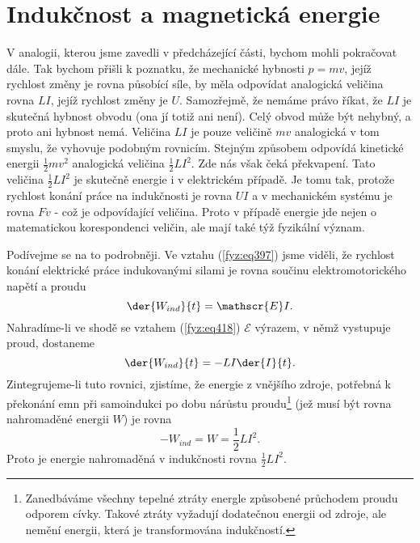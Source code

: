 \section{Indukčnost a magnetická energie}\label{fyz:IIchapXVIIsecVIII}
  V analogii, kterou jsme zavedli v předcházející části, bychom mohli pokračovat dále. Tak bychom 
  přišli k poznatku, že mechanické hybnosti \(p=mv\), jejíž rychlost změny je rovna působící síle, 
  by měla odpovídat analogická veličina rovna \(LI\), jejíž rychlost změny je \(U\). Samozřejmě, že 
  nemáme právo říkat, že \(LI\) je skutečná hybnost obvodu (ona jí totiž ani není). Celý obvod může
  být nehybný, a proto ani hybnost nemá. Veličina \(LI\) je pouze veličině \(mv\) analogická v tom 
  smyslu, že vyhovuje podobným rovnicím. Stejným způsobem odpovídá kinetické energii 
  \(\frac{1}{2}mv^2\) analogická veličina \(\frac{1}{2}LI^2\). Zde nás však čeká překvapení. Tato 
  veličina \(\frac{1}{2}LI^2\) je skutečně energie i v elektrickém případě. Je tomu tak, protože 
  rychlost konání práce na indukčnosti je rovna \(UI\) a v mechanickém systému je rovna \(Fv\) - 
  což je odpovídající veličina. Proto v případě energie jde nejen o matematickou korespondenci 
  veličin, ale mají také týž fyzikální význam. 

  Podívejme se na to podrobněji. Ve vztahu (\ref{fyz:eq397}) jsme viděli, že rychlost konání 
  elektrické práce indukovanými silami je rovna součinu elektromotorického napětí a proudu
  \begin{equation*}
    \der{W_{ind}}{t} = \mathscr{E}I.
  \end{equation*}
  Nahradíme-li ve shodě se vztahem (\ref{fyz:eq418}) \(\mathscr{E}\) výrazem, v němž vystupuje 
  proud, dostaneme
  \begin{equation}\label{fyz:eq420}
    \der{W_{ind}}{t} = -LI\der{I}{t}.
  \end{equation}
  Zintegrujeme-li tuto rovnici, zjistíme, že energie z vnějšího zdroje, potřebná k překonání emn 
  při samoindukci po dobu nárůstu proudu\footnote{Zanedbáváme všechny tepelné ztráty energle 
  způsobené průchodem proudu odporem cívky. Takové ztráty vyžadují dodatečnou energii od zdroje, 
  ale nemění energii, která je transformována indukčností.} (jež musí být rovna nahromaděné energii 
  \(W\)) je rovna
  \begin{equation}\label{fyz:eq421}
     - W_{ind} = W = \frac{1}{2}LI^2.
  \end{equation}
  Proto je energie nahromaděná v indukčnosti rovna \(\frac{1}{2}LI^2\).
  
